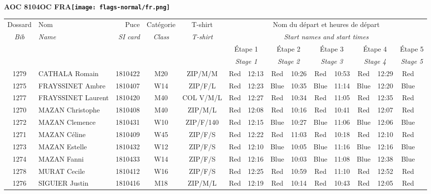 \documentclass{report}
\begin{document}
\newpage
  \Huge \centering \bfseries AOC 8104OC FRA\normalfont \footnotesize \sffamily \hfill \texttt{[image: flags-normal/fr.png]} \newline 
  \begin{longtable}{|c|l|r|c|c|*{5}{cc|}}
    Dossard & Nom  & Puce    & Catégorie & T-shirt & \multicolumn{10}{c|}{Nom du départ et heures de départ} \\
    \itshape Bib     & \itshape Name & \itshape SI card & \itshape Class  & \itshape  T-shirt  & \multicolumn{10}{c|}{\itshape Start names and start times} \\
    \hline
    & & & & & \multicolumn{2}{c|}{Étape 1} & \multicolumn{2}{c|}{Étape 2} & \multicolumn{2}{c|}{Étape 3} & \multicolumn{2}{c|}{Étape 4} & \multicolumn{2}{c|}{Étape 5} \\
    & & & & & \multicolumn{2}{c|}{\itshape Stage 1} & \multicolumn{2}{c|}{\itshape Stage 2} & \multicolumn{2}{c|}{\itshape Stage 3} & \multicolumn{2}{c|}{\itshape Stage 4} & \multicolumn{2}{c|}{\itshape Stage 5} \\
    \hline
    1279 & CATHALA Romain & 1810422 & M20 & ZIP/M/M & Red & 12:13 & Red & 10:26 & Red & 10:53 & Red & 12:29 & Red &  \\
    1275 & FRAYSSINET Ambre & 1810407 & W14 & ZIP/F/L & Red & 12:23 & Blue & 10:35 & Blue & 11:14 & Blue & 12:20 & Blue &  \\
    1277 & FRAYSSINET Laurent & 1810420 & M40 & COL V/M/L & Red & 12:27 & Red & 10:34 & Red & 11:05 & Red & 12:35 & Red &  \\
    1270 & MAZAN Christophe & 1810408 & M40 & ZIP/M/L & Red & 12:08 & Red & 10:16 & Red & 10:41 & Red & 12:07 & Red &  \\
    1272 & MAZAN Clemence & 1810431 & W10 & ZIP/F/140 & Red & 12:15 & Blue & 10:27 & Blue & 11:06 & Blue & 12:06 & Blue &  \\
    1271 & MAZAN Céline & 1810409 & W45 & ZIP/F/S & Red & 12:22 & Red & 11:03 & Red & 10:18 & Red & 12:10 & Red &  \\
    1273 & MAZAN Estelle & 1810432 & W12 & ZIP/F/S & Red & 12:10 & Blue & 10:05 & Blue & 11:16 & Blue & 12:16 & Blue &  \\
    1274 & MAZAN Fanni & 1810433 & W14 & ZIP/F/S & Red & 12:16 & Blue & 10:03 & Blue & 11:08 & Blue & 12:38 & Blue &  \\
    1278 & MURAT Cecile & 1810412 & W16 & ZIP/F/S & Red & 12:25 & Red & 10:59 & Red & 11:10 & Red & 12:52 & Red &  \\
    1276 & SIGUIER Justin & 1810416 & M18 & ZIP/M/L & Red & 12:19 & Red & 10:14 & Red & 10:43 & Red & 12:05 & Red &  \\
  \end{longtable}
\end{document}
